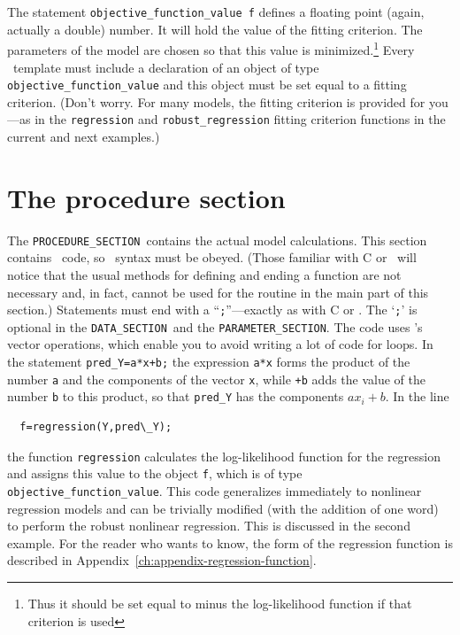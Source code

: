 \documentclass{admbmanual}
\newcommand\DS{\texttt{DATA\_SECTION}}
\newcommand\PS{\texttt{PARAMETER\_SECTION}}
\newcommand\PROS{\texttt{PROCEDURE\_SECTION}}
\begin{document}
The statement \texttt{objective\_function\_value f} defines a floating point
(again, actually a double) number. It will hold the value of the fitting
criterion. The parameters of the model are chosen so that this value is
minimized.\footnote{Thus it should be set equal to minus the log-likelihood
  function if that criterion is used} Every \ADM\ template must include a
declaration of an object of type \texttt{objective\_function\_value} and this
object must be set equal to a fitting criterion. (Don't worry. For many models,
the fitting criterion is provided for you---as in the \texttt{regression} and
\texttt{robust\_regression} fitting criterion functions in the current and next
examples.)

\section{The procedure section}

The \PROS\ contains the actual model calculations. This section contains \cplus\
code, so \cplus\ syntax must be obeyed. (Those familiar with C or \cplus\ will
notice that the usual methods for defining and ending a function are not
necessary and, in fact, cannot be used for the routine in the main part of this
section.)
Statements must end with a ``\texttt{;}''---exactly as with C or \cplus. The
`\texttt{;}' is optional in the \DS\ and the \PS. The code uses \scAD's vector
operations, which enable you to avoid writing a lot of code for loops. In the
statement \texttt{pred\_Y=a*x+b;} the expression \texttt{a*x} forms the product
of the number \texttt{a} and the components of the vector \texttt{x}, while
\texttt{+b} adds the value of the number \texttt{b} to this product, so that
\texttt{pred\_Y} has the components $ax_i+b$. In the line
\begin{lstlisting}
  f=regression(Y,pred\_Y);
\end{lstlisting}
the function \texttt{regression} calculates the log-likelihood function for the
regression and assigns this value to the object \texttt{f}, which is of type
\texttt{objective\_function\_value}. This code generalizes immediately to
nonlinear regression models and can be trivially modified (with the addition of
one word) to perform the robust nonlinear regression. This is discussed in the
second example. For the reader who wants to know, the form of the regression
function is described in Appendix~\ref{ch:appendix-regression-function}.
\X{use of \fontindexentry{tt}{regression} function}
\end{document}
